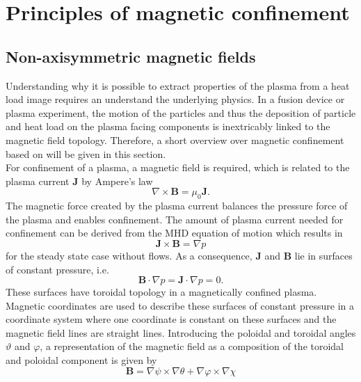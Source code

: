 %
\chapter{Principles of magnetic confinement}
\label{sec:principles}

\section{Non-axisymmetric magnetic fields}
Understanding why it is possible to extract properties of the plasma from a heat load image requires an understand the underlying physics. In a fusion device or plasma experiment, the motion of the particles and thus the deposition of particle and heat load on the plasma facing components is inextricably linked to the magnetic field topology. Therefore, a short overview over magnetic confinement based on \cite{Helander2014} will be given in this section.\\
For confinement of a plasma, a magnetic field is required, which is related to the plasma current \textbf{J} by Ampere's law
\begin{equation}
    \nabla \times \textbf{B} = \mu_0\textbf{J}.
\end{equation}
The magnetic force created by the plasma current balances the pressure force of the plasma and enables confinement. The amount of plasma current needed for confinement can be derived from the MHD equation of motion which results in
\begin{equation}
    \textbf{J} \times \textbf{B} = \nabla p \label{eq2}
\end{equation}
for the steady state case without flows. As a consequence, \textbf{J} and \textbf{B} lie in surfaces of constant pressure, i.e.
\begin{equation}
    \textbf{B}\cdot \nabla p =  \textbf{J}\cdot \nabla p = 0.
    \label{eq3}
\end{equation}
These surfaces have toroidal topology in a magnetically confined plasma.
Magnetic coordinates are used to describe these surfaces of constant pressure in a coordinate system where one coordinate is constant on these surfaces and the magnetic field lines are straight lines. Introducing the poloidal and toroidal angles $\vartheta$ and $\varphi$, a representation of the magnetic field as a composition of the toroidal and poloidal component is given by
\begin{equation}
    \textbf{B} = \nabla \psi \times \nabla \theta + \nabla \varphi \times \nabla \chi
\end{equation}
